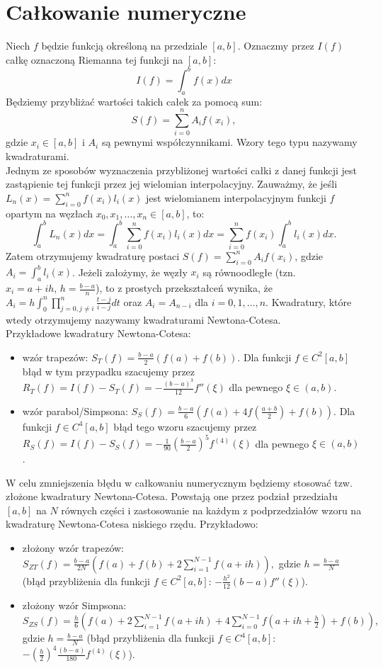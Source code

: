 \documentclass[12pt,a4paper]{article}
\theoremstyle{definition}
\begin{document}
	\section*{Całkowanie numeryczne}
Niech $f$ będzie funkcją określoną na przedziale $[a,b]$. Oznaczmy przez $I(f)$ całkę oznaczoną Riemanna tej funkcji na $[a,b]$:
$$I(f)=\int_a^bf(x)dx$$
Będziemy przybliżać wartości takich całek za pomocą sum:
$$S(f)=\sum_{i=0}^n A_if(x_i),$$
gdzie $x_i\in [a,b]$ i $A_i$ są pewnymi współczynnikami. Wzory tego typu nazywamy kwadraturami.\\
Jednym ze sposobów wyznaczenia przybliżonej wartości całki z danej funkcji jest zastąpienie tej funkcji przez jej wielomian interpolacyjny. Zauważmy, że jeśli $L_n(x)=\sum_{i=0}^n f(x_i)l_i(x)$ jest wielomianem interpolacyjnym funkcji $f$ opartym na węzłach $x_0,x_1,\ldots,x_n\in [a,b]$, to:
$$\int_a^bL_n(x)dx=\int_a^b\sum_{i=0}^n f(x_i)l_i(x)dx=\sum_{i=0}^n f(x_i)\int_a^bl_i(x)dx.$$
Zatem otrzymujemy kwadraturę postaci $S(f)=\sum_{i=0}^nA_if(x_i)$, gdzie $A_i=\int_a^bl_i(x)$. Jeżeli założymy, że węzły $x_i$ są równoodległe (tzn. $x_i=a+ih,\, h=\frac{b-a}{n}$), to z prostych przekształceń wynika, że $A_i=h\int_0^n\prod_{j=0,j\neq i}^n\frac{t-j}{i-j}dt$ oraz $A_i=A_{n-i}$ dla $i=0,1,\ldots,n$. Kwadratury, które wtedy otrzymujemy nazywamy kwadraturami Newtona-Cotesa.\\
Przykładowe kwadratury Newtona-Cotesa:
\begin{itemize}
	\item wzór trapezów: $S_T(f)=\frac{b-a}{2}(f(a)+f(b)).$ Dla funkcji $f\in C^2[a,b]$ błąd w tym przypadku szacujemy przez $R_T(f)=I(f)-S_T(f)=-\frac{(b-a)^3}{12}f''(\xi)$
	dla pewnego $\xi\in (a,b)$.
	\item wzór parabol/Simpsona: $S_S(f)=\frac{b-a}{6}\left(f(a)+4f\left(\frac{a+b}{2}\right)+f(b)\right).$ Dla funkcji $f\in C^4[a,b]$ błąd tego wzoru szacujemy przez
	$R_S(f)=I(f)-S_S(f)=-\frac{1}{90}\left(\frac{b-a}{2}\right)^5f^{(4)}(\xi)$
	dla pewnego $\xi\in (a,b)$.
\end{itemize}
W celu zmniejszenia błędu w całkowaniu numerycznym będziemy stosować tzw. złożone kwadratury Newtona-Cotesa. Powstają one przez podział przedziału $[a,b]$ na $N$ równych części i zastosowanie na każdym z podprzedziałów wzoru na kwadraturę Newtona-Cotesa niskiego rzędu. Przykładowo:
\begin{itemize}
	\item złożony wzór trapezów:
	$S_{ZT}(f)=\frac{b-a}{2N}\left(f(a)+f(b)+2\sum_{i=1}^{N-1}f(a+ih)\right),$ gdzie
	$h=\frac{b-a}{N}$ (błąd przybliżenia dla funkcji $f\in C^2[a,b]$: $-\frac{h^2}{12}(b-a)f''(\xi)$). 
	\item złożony wzór Simpsona: $S_{ZS}(f)=\frac{h}{6}\left(f(a)+2\sum_{i=1}^{N-1}f(a+ih)+4\sum_{i=0}^{N-1}f(a+ih+\frac{h}{2})+f(b)\right),$ gdzie $h=\frac{b-a}{N}$ (błąd przybliżenia dla funkcji $f\in C^4[a,b]$: $-\left(\frac{h}{2}\right)^4\frac{(b-a)}{180}f^{(4)}(\xi)$).
\end{itemize}
\end{document}

